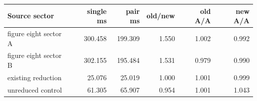 \begin{center}
\begin{tabular}{lrrrrr}
\toprule
Source sector & single ms & pair ms & old/new & old A/A & new A/A\\
\midrule
figure eight sector A & 300.458 & 199.309 & 1.550 & 1.002 & 0.992\\
figure eight sector B & 302.155 & 195.484 & 1.531 & 0.979 & 0.990\\
existing reduction & 25.076 & 25.019 & 1.000 & 1.001 & 0.999\\
unreduced control & 61.305 & 65.907 & 0.954 & 1.001 & 1.043\\
\bottomrule
\end{tabular}
\end{center}
